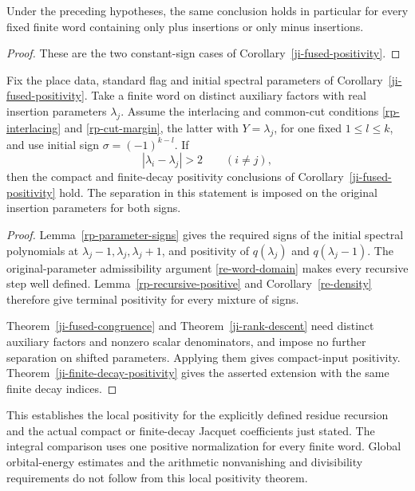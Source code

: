 \begin{corollary}\label{ji-single-sign-positivity}
Under the preceding hypotheses, the same conclusion holds in
particular for every fixed finite word containing only plus
insertions or only minus insertions.
\end{corollary}

\begin{proof}
These are the two constant-sign cases of
Corollary~\ref{ji-fused-positivity}.
\end{proof}

\begin{corollary}\label{ji-unshifted-positivity}
Fix the place data, standard flag and initial spectral parameters of
Corollary~\ref{ji-fused-positivity}. Take a finite word on distinct
auxiliary factors with real insertion parameters \(\lambda_j\).
Assume the interlacing and common-cut conditions
\eqref{rp-interlacing} and \eqref{rp-cut-margin}, the latter with
\(Y=\lambda_j\), for one fixed \(1\le l\le k\), and use initial
sign \(\sigma=(-1)^{k-l}\). If
\[
                     |\lambda_i-\lambda_j|>2\qquad(i\ne j),
\]
then the compact and finite-decay positivity conclusions of
Corollary~\ref{ji-fused-positivity} hold. The separation in this
statement is imposed on the original insertion parameters for both signs.
\end{corollary}

\begin{proof}
Lemma~\ref{rp-parameter-signs} gives the required signs of the initial
spectral polynomials at \(\lambda_j-1,\lambda_j,\lambda_j+1\),
and positivity of \(q(\lambda_j)\) and \(q(\lambda_j-1)\).
The original-parameter admissibility argument
\eqref{re-word-domain} makes every recursive step well defined.
Lemma~\ref{rp-recursive-positive} and Corollary~\ref{re-density}
therefore give terminal positivity for every mixture of signs.

Theorem~\ref{ji-fused-congruence} and Theorem~\ref{ji-rank-descent}
need distinct auxiliary factors and nonzero scalar denominators, and
impose no further separation on shifted parameters. Applying them gives
compact-input positivity. Theorem~\ref{ji-finite-decay-positivity}
gives the asserted extension with the same finite decay indices.
\end{proof}

This establishes the local positivity for the explicitly defined
residue recursion and the actual compact or finite-decay Jacquet
coefficients just stated. The integral comparison uses one positive
normalization for every finite word. Global orbital-energy estimates and
the arithmetic nonvanishing and divisibility requirements do not
follow from this local positivity theorem.
